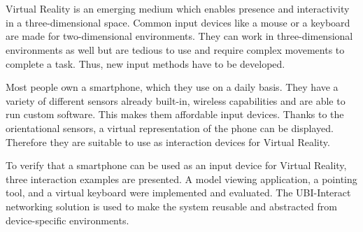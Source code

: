 \chapter{\abstractname}

Virtual Reality is an emerging medium which enables presence and interactivity in a three-dimensional space. Common input devices like a mouse or a keyboard are made for two-dimensional environments. They can work in three-dimensional environments as well but are tedious to use and require complex movements to complete a task. Thus, new input methods have to be developed. 

Most people own a smartphone, which they use on a daily basis. They have a variety of different sensors already built-in, wireless capabilities and are able to run custom software. This makes them affordable input devices. Thanks to the orientational sensors, a virtual representation of the phone can be displayed. Therefore they are suitable to use as interaction devices for Virtual Reality.

To verify that a smartphone can be used as an input device for Virtual Reality, three interaction examples are presented. A model viewing application, a pointing tool, and a virtual keyboard were implemented and evaluated. The UBI-Interact networking solution is used to make the system reusable and abstracted from device-specific environments.
